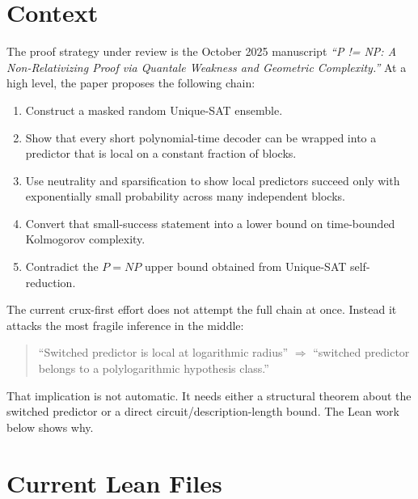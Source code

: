 \documentclass[11pt]{article}
\theoremstyle{remark}
\begin{document}
\section{Context}

The proof strategy under review is the October 2025 manuscript
\emph{``P != NP: A Non-Relativizing Proof via Quantale Weakness and Geometric Complexity.''}
At a high level, the paper proposes the following chain:
\begin{enumerate}[leftmargin=1.5em]
  \item Construct a masked random Unique-SAT ensemble.
  \item Show that every short polynomial-time decoder can be wrapped into a predictor that is
  local on a constant fraction of blocks.
  \item Use neutrality and sparsification to show local predictors succeed only with exponentially
  small probability across many independent blocks.
  \item Convert that small-success statement into a lower bound on time-bounded Kolmogorov
  complexity.
  \item Contradict the $P=NP$ upper bound obtained from Unique-SAT self-reduction.
\end{enumerate}

The current crux-first effort does not attempt the full chain at once.  Instead it attacks the
most fragile inference in the middle:

\begin{quote}
``Switched predictor is local at logarithmic radius'' $\Longrightarrow$
``switched predictor belongs to a polylogarithmic hypothesis class.''
\end{quote}

That implication is not automatic.  It needs either a structural theorem about the switched
predictor or a direct circuit/description-length bound.  The Lean work below shows why.

\section{Current Lean Files}
\end{document}
